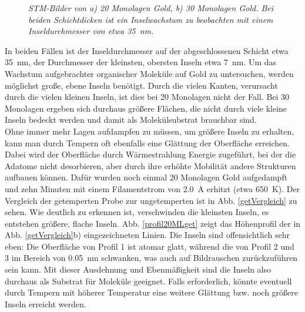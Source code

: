 \begin{figure}[H]
	\begin{minipage}[b]{0.5\textwidth} 
		\sffamily
		
	\end{minipage}
	\hfill
	\begin{minipage}[b]{0.5\textwidth}
		\sffamily
		
	\end{minipage}
	\caption{\textit{STM-Bilder von a) 20 Monolagen Gold, b) 30 Monolagen Gold. Bei beiden
	Schichtdicken ist ein Inselwachstum zu beobachten mit einem Inseldurchmesser von etwa \SI{35}{nm}.}}
	\label{MLVergleich} 
\end{figure}

In beiden Fällen ist der Inseldurchmesser auf der abgeschlossenen Schicht etwa \SI{35}{nm}, der Durchmesser
der kleinsten, obersten Inseln etwa \SI{7}{nm}. Um das Wachstum aufgebrachter organischer Moleküle
auf Gold zu untersuchen, werden möglichst große, ebene Inseln benötigt. Durch die vielen Kanten,
verursacht durch die vielen kleinen Inseln, ist dies bei 20 Monolagen nicht der Fall. Bei 30
Monolagen ergeben sich durchaus größere Flächen, die nicht durch viele kleine Inseln bedeckt werden und damit als Molekülsubstrat brauchbar sind.
\\
Ohne immer mehr Lagen aufdampfen zu müssen, um größere Inseln zu erhalten, kann man durch Tempern
oft ebenfalls eine Glättung der Oberfläche erreichen. Dabei wird der Oberfläche durch Wärmestrahlung 
Energie zugeführt, bei der die Adatome nicht desorbieren, aber durch ihre erhöhte Mobilität
andere Strukturen aufbauen können. Dafür wurden noch einmal 20 Monolagen Gold aufgedampft und zehn
Minuten mit einem Filamentstrom von \SI{2,0}{A} erhitzt (etwa \SI{650}{K}). Der Vergleich der
getemperten Probe zur ungetemperten ist in Abb. \ref{getVergleich} zu sehen.
Wie deutlich zu erkennen ist, verschwinden die kleinsten Inseln, es entstehen größere, flache
Inseln. Abb. \ref{profil20MLget} zeigt das Höhenprofil der in Abb. \ref{getVergleich}b)
eingezeichneten Linien. Die Inseln sind offensichtlich sehr eben: Die Oberfläche von Profil 1 ist
atomar glatt, während die von Profil 2 und 3 im Bereich von \SI{0,05}{nm} schwanken, was auch auf
Bildrauschen zurückzuführen sein kann. Mit dieser Ausdehnung und Ebenmäßigkeit sind die Inseln also
durchaus als Substrat für Moleküle geeignet. Falls erforderlich, könnte eventuell durch Tempern
mit höherer Temperatur eine weitere Glättung bzw. noch größere Inseln erreicht werden.

